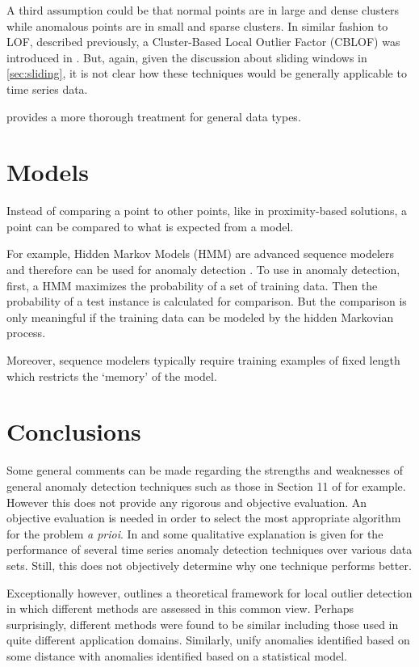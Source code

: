 A third assumption could be that normal points are in large and dense clusters while anomalous points are in small and sparse clusters. In similar fashion to LOF, described previously, a Cluster-Based Local Outlier Factor (CBLOF) was introduced in \cite{He2003}. But, again, given the discussion about sliding windows in \ref{sec:sliding}, it is not clear how these techniques would be generally applicable to time series data.

\cite{Chandola2009} provides a more thorough treatment for general data types.


\section{Models}

Instead of comparing a point to other points, like in proximity-based solutions, a point can be compared to what is expected from a model. 

For example, Hidden Markov Models (HMM) are advanced sequence modelers and therefore can be used for anomaly detection \cite{Zhang2003,Qiao2002,qiao2002anomaly,Florez-Larrahondo2005}. To use in anomaly detection, first, a HMM maximizes the probability of a set of training data. Then the probability of a test instance is calculated for comparison. But the comparison is only meaningful if the training data can be modeled by the hidden Markovian process.

Moreover, sequence modelers typically require training examples of fixed length which restricts the `memory' of the model.


\section{Conclusions} 

Some general comments can be made regarding the strengths and weaknesses of general anomaly detection techniques such as those in Section 11 of \cite{Chandola2009} for example. However this does not provide any rigorous and objective evaluation. An objective evaluation is needed in order to select the most appropriate algorithm for the problem \emph{a prioi}. In \cite{Cheboli2010} and \cite{Chandola2008} some qualitative explanation is given for the performance of several time series anomaly detection techniques over various data sets. Still, this does not objectively determine why one technique performs better.

Exceptionally however, \cite{Schubert2014} outlines a theoretical framework for local outlier detection in which different methods are assessed in this common view. Perhaps surprisingly, different methods were found to be similar including those used in quite different application domains. Similarly, \cite{knorr1997unified} unify anomalies identified based on some distance with anomalies identified based on a statistical model.

